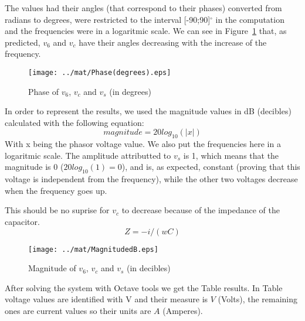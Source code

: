 The values had their angles (that correspond to their phases) converted from radians to degrees, were restricted to the interval [-90;90]$^{\circ}$ in the computation and the frequencies were in a logaritmic scale. We can see in Figure~\ref{fig:mat5db} that, as predicted, $v_6$ and $v_c$ have their angles decreasing with the increase of the frequency.

\begin{figure}[H] \centering
\texttt{[image: ../mat/Phase(degrees).eps]}
\caption{Phase of $v_6$, $v_c$ and $v_s$ (in degrees)}
\label{fig:mat5db}
\end{figure}

In order to represent the results, we used the magnitude values in dB (decibles) calculated with the following equation:
\begin{equation}
magnitude = 20log_{10}(|x|)
\label{eq:1.21}
\end{equation}
With x being the phasor voltage value. 
We also put the frequencies here in a logaritmic scale. The amplitude attributted to $v_s$ is 1, which means that the magnitude is 0 ($20log_{10}(1)=0$), and is, as expected, constant (proving that this voltage is independent from the frequency), while the other two voltages decrease when the frequency goes up. 

This should be no suprise for $v_c$ to decrease because of the impedance of the capacitor.
\begin{equation}
Z = -i/(wC)
\label{eq:1.22}
\end{equation}

\begin{figure}[H] \centering
\texttt{[image: ../mat/MagnitudedB.eps]}
\caption{Magnitude of $v_6$, $v_c$ and $v_s$ (in decibles)}
\label{fig:mat5ps}
\end{figure}



After solving the system with Octave tools we get the Table results. In Table voltage values are identified with V and their measure is $V$ (Volts), the remaining ones are current values so their units are $A$ (Amperes).





